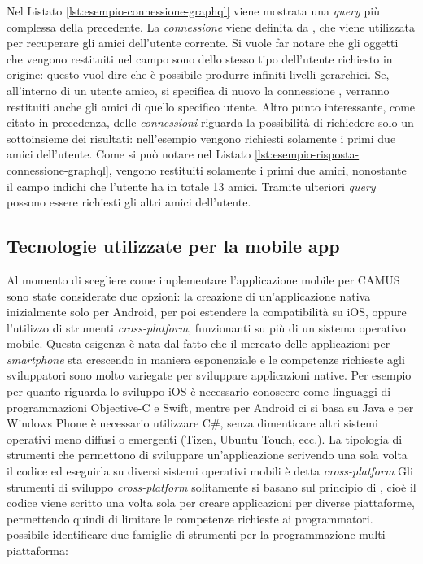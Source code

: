 Nel Listato \ref{lst:esempio-connessione-graphql} viene mostrata una \emph{query} più complessa della precedente. La \emph{connessione} viene definita da , che viene utilizzata per recuperare gli amici dell'utente corrente. Si vuole far notare che gli oggetti che vengono restituiti nel campo  sono dello stesso tipo dell'utente richiesto in origine: questo vuol dire che è possibile produrre infiniti livelli gerarchici. Se, all'interno di un utente amico, si specifica di nuovo la connessione , verranno restituiti anche gli amici di quello specifico utente. Altro punto interessante, come citato in precedenza, delle \emph{connessioni} riguarda la possibilità di richiedere solo un sottoinsieme dei risultati: nell'esempio vengono richiesti solamente i primi due amici dell'utente. Come si può notare nel Listato \ref{lst:esempio-risposta-connessione-graphql}, vengono restituiti solamente i primi due amici, nonostante il campo  indichi che l'utente ha in totale 13 amici. Tramite ulteriori \emph{query} possono essere richiesti gli altri amici dell'utente.

\subsection{Tecnologie utilizzate per la mobile app}\label{sec:panoramica-cross-platform-mobile}

Al momento di scegliere come implementare l'applicazione mobile per CAMUS sono state considerate due opzioni: la creazione di un'applicazione nativa inizialmente solo per Android, per poi estendere la compatibilità su iOS, oppure l'utilizzo di strumenti \emph{cross-platform}, funzionanti su più di un sistema operativo mobile.
Questa esigenza è nata dal fatto che il mercato delle applicazioni per \emph{smartphone} sta crescendo in maniera esponenziale e le competenze richieste agli sviluppatori sono molto variegate per sviluppare applicazioni native.
Per esempio per quanto riguarda lo sviluppo iOS è necessario conoscere come linguaggi di programmazioni Objective-C e Swift, mentre per Android ci si basa su Java e per Windows Phone è necessario utilizzare C\#, senza dimenticare altri sistemi operativi meno diffusi o emergenti (Tizen, Ubuntu Touch, ecc.). La tipologia di strumenti che permettono di sviluppare un'applicazione scrivendo una sola volta il codice ed eseguirla su diversi sistemi operativi mobili è detta \emph{cross-platform}
Gli strumenti di sviluppo \emph{cross-platform} solitamente si basano sul principio di , cioè il codice viene scritto una volta sola per creare applicazioni per diverse piattaforme, permettendo quindi di limitare le competenze richieste ai programmatori. 
\upe possibile identificare due famiglie di strumenti per la programmazione multi piattaforma:

